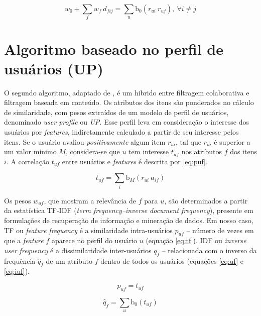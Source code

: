 \begin{equation}
\label{eq:determinacao-wf} 
    w_0 + \sum_{f}{w_{f} ~ d_{fij}} = \sum_{u}{\mathrm{b_0}\left(r_{ui} ~ r_{uj}\right)},~\forall i \neq j 
\end{equation} 

\section{Algoritmo baseado no perfil de usuários (UP)} %
\label{sec:algoritmo_baseado_no_perfil_de_usu_rios_}


O segundo algoritmo, adaptado de \cite{debnath2008feature}, é um hibrido entre filtragem colaborativa e filtragem baseada em conteúdo. Os atributos dos itens são ponderados no cálculo de similaridade, com pesos extraídos de um modelo de perfil de usuários, denominado \textit{user profile} ou \textit{UP}. Esse perfil leva em consideração o interesse dos usuários por \textit{features}, indiretamente calculado a partir de seu interesse pelos itens. Se o usuário avaliou \textit{positivamente} algum item $r_{ui}$, tal que $r_{ui}$ é superior a um valor mínimo $M$, considera-se que $u$ tem interesse $t_{uf}$ nos atributos $f$ dos itens $i$. A correlação $t_{uf}$ entre usuários e \textit{features} é descrita por \ref{eq:puf}.

\begin{equation}
\label{eq:puf} 
    t_{uf} = \sum_{i}{\mathrm{b}_M\left(r_{ui}~a_{if}\right)} 
\end{equation} 

Os pesos $w_{uf}$, que mostram a relevância de $f$ para $u$, são determinados a partir da estatística TF-IDF (\textit{term frequency--inverse document frequency}), presente em formulações de recuperação de informação e mineração de dados. Em nosso caso, TF ou \textit{feature frequency} é a similaridade intra-usuários $p_{uf}$ -- número de vezes em que a \textit{feature} $f$ aparece no perfil do usuário $u$ (equação \ref{eq:tf}). IDF ou \textit{inverse user frequency} é a dissimilaridade inter-usuários $q_{f}$ -- relacionada com o inverso da frequência $\hat{q}_{f}$ de um atributo $f$ dentro de todos os usuários (equações \ref{eq:uf} e \ref{eq:iuf}).

\begin{equation}
\label{eq:tf} 
    p_{uf} = t_{uf}
\end{equation} 


\begin{equation}
\label{eq:uf} 
    \hat{q}_{f} = \sum_{u}{\mathrm{b}_0\left(t_{uf}\right)}
\end{equation} 

